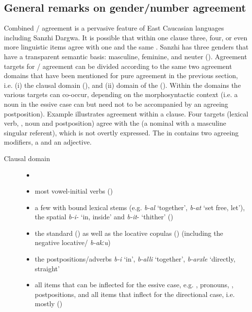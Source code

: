 \subsection{General remarks on gender/number agreement}
\label{General remarks on gender/number agreement} 
Combined / agreement is a pervasive feature of East Caucasian languages including Sanzhi Dargwa. It is possible that within one clause three, four, or even more linguistic items agree with one and the same . Sanzhi has three genders that have a transparent semantic basis: masculine, feminine, and neuter (). Agreement targets for / agreement can be divided according to the same two agreement domains that have been mentioned for pure  agreement in the previous section, i.e. (i) the clausal domain (), and (ii) domain of the  (). Within the domains the various targets can co-occur, depending on the morphosyntactic context (i.e. a noun in the essive case can but need not to be accompanied by an agreeing postposition). Example  illustrates agreement within a clause. Four targets (lexical verb, , noun and postposition) agree with the  (a nominal with a masculine singular referent), which is not overtly expressed. The  in  contains two agreeing modifiers, a  and an adjective.


\begin{description}
\item[Clausal domain]
\begin{itemize}[leftmargin=*]
    \item[]
	\item	most vowel-initial verbs ()
	\item a few  with bound lexical stems (e.g. \textit{b-al} ‘together', \textit{b-at} ‘set free, let'), the spatial  \textit{b-i-} `in, inside' and \textit{b-it}- ‘thither' ()
	\item the standard  () as well as the locative copulas () (including the negative locative/ \textit{b-akːu})
	\item the postpositions/adverbs \textit{b-i} ‘in', \textit{b-alli} ‘together', \textit{b-arxle} ‘directly, straight'
	\item	all items that can be inflected for the essive case, e.g. , pronouns, , postpositions, and all items that inflect for the directional case, i.e. mostly  ()
\end{itemize}
\end{description}

